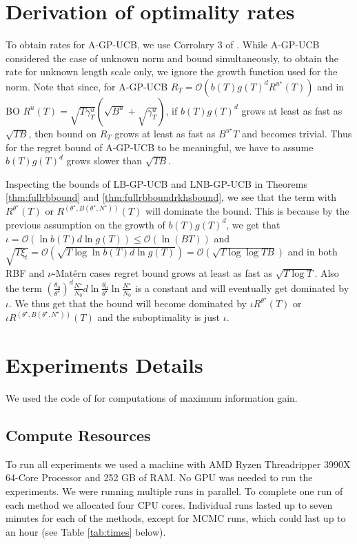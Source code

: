 \documentclass{article}
\theoremstyle{plain}
\theoremstyle{definition}
\theoremstyle{remark}
\theoremstyle{plain}
\begin{document}
\section{Derivation of optimality rates} \label{app:optimality}
To obtain rates for A-GP-UCB, we use Corrolary 3 of \cite{berkenkamp2019no}. While A-GP-UCB considered the case of unknown norm and bound simultaneously, to obtain the rate for unknown length scale only, we ignore the growth function used for the norm. Note that since, for A-GP-UCB $R_T = \mathcal{O}(b(T)g(T)^d R^{u^\star}(T))$ and in BO $R^u(T) = \sqrt{T \gamma_T^u}(\sqrt{B^u} + \sqrt{\gamma^u_T})$, if $b(T)g(T)^d$ grows at least as fast as $\sqrt{T B}$, then bound on $R_T$ grows at least as fast as $B^{u^\star}T$ and becomes trivial. Thus for the regret bound of A-GP-UCB to be meaningful, we have to assume $b(T)g(T)^d$ grows slower than $\sqrt{T B}$.

Inspecting the bounds of LB-GP-UCB and LNB-GP-UCB in Theorems \ref{thm:fullrbbound} and \ref{thm:fullrbboundrkhsbound}, we see that the term with $R^{\theta^\star}(T)$ or $R^{(\theta^\star, B(\theta^\star, N^\star))}(T)$ will dominate the bound. This is because by the previous assumption on the growth of $b(T)g(T)^d$, we get that $\iota = \mathcal{O}(\ln b(T) d \ln g(T)) \le  \mathcal{O}(\ln(BT))$ and  $\sqrt{T\xi_t} = \mathcal{O}( \sqrt{T\log \ln b(T) d \ln g(T)}) = \mathcal{O}( \sqrt{T\log \log TB})$ and in both RBF and $\nu$-Matérn cases regret bound grows at least as fast as $\sqrt{T \log T}$. Also the term $\left(\frac{\theta_0}{\theta^\star}\right)^{d}  \frac{N^\star}{N_0} d \ln\frac{\theta_0}{\theta^\star}   \ln \frac{N^\star}{N_0}$ is a constant and will eventually get dominated by $\iota$. We thus get that the bound will become dominated by $\iota R^{\theta^\star}(T)$ or $\iota R^{(\theta^\star, B(\theta^\star, N^\star))}(T)$ and the suboptimality is just $\iota$.

\newpage
\section{Experiments Details}
We used the code of \cite{hong2023optimization} for computations of maximum information gain.
\subsection{Compute Resources} \label{app:compute}
To run all experiments we used a machine with AMD Ryzen Threadripper 3990X 64-Core Processor and 252 GB of RAM. No GPU was needed to run the experiments. We were running multiple runs in parallel. To complete one run of each method we allocated four CPU cores. Individual runs lasted up to seven minutes for each of the methods, except for MCMC runs, which could last up to an hour (see Table \ref{tab:times} below).
\end{document}
